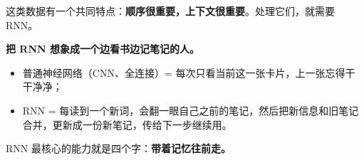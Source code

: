 \documentclass[a4paper,11pt]{ctexart}
\begin{document}
这类数据有一个共同特点：\textbf{顺序很重要，上下文很重要}。处理它们，就需要 RNN。

\begin{metaphorbox}
    \textbf{把 RNN 想象成一个边看书边记笔记的人。}

    \begin{itemize}
        \item 普通神经网络（CNN、全连接）= 每次只看当前这一张卡片，上一张忘得干干净净；
        \item RNN = 每读到一个新词，会翻一眼自己之前的笔记，然后把新信息和旧笔记合并，更新成一份新笔记，传给下一步继续用。
    \end{itemize}

    RNN 最核心的能力就是四个字：\textbf{带着记忆往前走。}
\end{metaphorbox}
\end{document}

